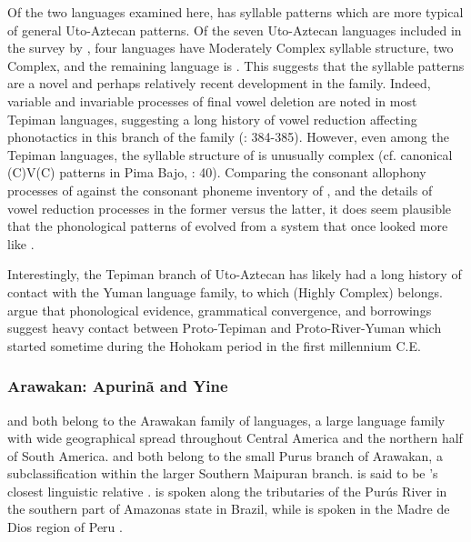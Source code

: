   Of the two languages examined here,  has syllable patterns which are more typical of general Uto-Aztecan patterns. Of the seven Uto-Aztecan languages included in the survey by \citet{Maddieson2013a}, four languages have Moderately Complex syllable structure, two Complex, and the remaining language is . This suggests that the  syllable patterns are a novel and perhaps relatively recent development in the family. Indeed, variable and invariable processes of final vowel deletion are noted in most Tepiman languages, suggesting a long history of vowel reduction affecting phonotactics in this branch of the family (\citealt{ShaulHill1998}: 384-385). However, even among the Tepiman languages, the syllable structure of  is unusually complex (cf. canonical (C)V(C) patterns in Pima Bajo,  \citealt{EstradaFernández2014}: 40). Comparing the consonant allophony processes of  against the consonant phoneme inventory of , and the details of vowel reduction processes in the former versus the latter, it does seem plausible that the phonological patterns of  evolved from a system that once looked more like .

  Interestingly, the Tepiman branch of Uto-Aztecan has likely had a long history of contact with the Yuman language family, to which  (Highly Complex) belongs. \citet{ShaulHill1998} argue that phonological evidence, grammatical convergence, and borrowings suggest heavy contact between Proto-Tepiman and Proto-River-Yuman which started sometime during the Hohokam period in the first millennium C.E.

\subsubsection{{Arawakan:} {Apurinã} {and} {Yine}}\label{sec:8.4.3.2}

   and  both belong to the Arawakan family of languages, a large language family with wide geographical spread throughout Central America and the northern half of South America.  and  both belong to the small Purus branch of Arawakan, a subclassification within the larger Southern Maipuran branch.  is said to be ’s closest linguistic relative \citep{Facundes2002}.  is spoken along the tributaries of the Purús River in the southern part of Amazonas state in Brazil, while  is spoken in the Madre de Dios region of Peru \citep{Aikhenvald1999}.

